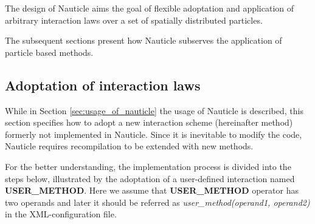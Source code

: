 \documentclass[a4paper,12pt,openany]{book}
\theoremstyle{break}
\begin{document}
The design of Nauticle aims the goal of flexible adoptation and application of arbitrary interaction laws over a set of spatially distributed particles.


The subsequent sections present how Nauticle subserves the application of particle based methods.

\subsection{Adoptation of interaction laws}
While in Section \ref{sec:usage_of_nauticle} the usage of Nauticle is described, this section specifies how to adopt a new interaction scheme (hereinafter method) formerly not implemented in Nauticle. Since it is inevitable to modify the code, Nauticle requires recompilation to be extended with new methods.

For the better understanding, the implementation process is divided into the steps below, illustrated by the adoptation of a user-defined interaction named \textbf{USER\_METHOD}. Here we assume that \textbf{USER\_METHOD} operator has two operands and later it should be referred as \textit{user\_method(operand1, operand2)} in the XML-configuration file.
\end{document}
